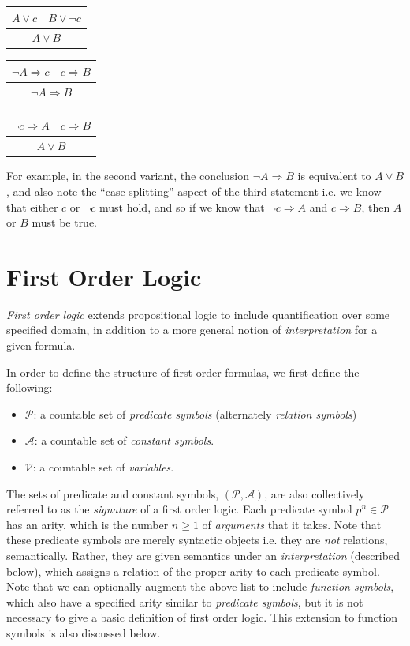 \documentclass[10pt]{article}
\begin{document}
\begin{center}
    \begin{tabular}{ c c }
     $A \vee c$ & $B \vee \neg c$ \\ \hline
     \multicolumn{2}{c}{$A \vee B$}
    \end{tabular}\;\;\;
    \begin{tabular}{ c c }
        $\neg A \Rightarrow c$ & $c \Rightarrow B$ \\ \hline
        \multicolumn{2}{c}{$\neg A \Rightarrow B$}
    \end{tabular} \;\;\;
    \begin{tabular}{ c c }
        $\neg c \Rightarrow A$ & $c \Rightarrow B$ \\ \hline
        \multicolumn{2}{c}{$A \vee B$}
    \end{tabular}
\end{center}

For example, in the second variant, the conclusion $\neg A \Rightarrow B$ is equivalent to $A \vee B$, and also note the ``case-splitting'' aspect of the third statement i.e. we know that either $c$ or $\neg c$ must hold, and so if we know that $\neg c \Rightarrow A$ and $c \Rightarrow B$, then $A$ or $B$ must be true.

\section{First Order Logic}

\textit{First order logic} extends propositional logic to include quantification over some specified domain, in addition to a more general notion of \textit{interpretation} for a given formula.

In order to define the structure of first order formulas, we first define the following:
\begin{itemize}
    \item $\mathcal{P}$: a countable set of \textit{predicate symbols} (alternately \textit{relation symbols})
    \item  $\mathcal{A}$: a countable set of \textit{constant symbols}.
    \item $\mathcal{V}$: a countable set of \textit{variables}.
\end{itemize}
The sets of predicate and constant symbols, $(\mathcal{P}, \mathcal{A})$, are also collectively referred to as the \textit{signature} of a first order logic. Each predicate symbol $p^n \in \mathcal{P}$ has an arity, which is the number $n \geq 1$ of \textit{arguments} that it takes. Note that these predicate symbols are merely syntactic objects i.e. they are \textit{not} relations, semantically. Rather, they are given semantics under an \textit{interpretation} (described below), which assigns a relation of the proper arity to each predicate symbol. Note that we can optionally augment the above list to include \textit{function symbols}, which also have a specified arity similar to \textit{predicate symbols}, but it is not necessary to give a basic definition of first order logic. This extension to function symbols is also discussed below.
\end{document}
